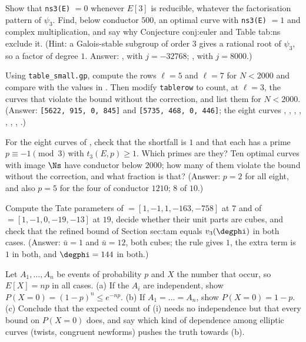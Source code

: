 \begin{sloppypar}
\begin{exercise}\label{exer:computation:ns3-reducible}
Show that \texttt{ns3(E)} $=0$ whenever $E[3]$ is reducible, whatever the factorisation pattern of $\psi_3$. Find, below conductor $500$, an optimal curve with
\texttt{ns3(E)} $=1$ and complex multiplication, and say why Conjecture conj:euler and Table tab:ns exclude it. (Hint: a Galois-stable subgroup of order $3$
gives a rational root of $\psi_3$, so a factor of degree $1$. Answer: , with $j=-32768$; , with $j=8000$.)
\end{exercise}

\begin{exercise}\label{exer:computation:tablerow}
Using \texttt{table\_small.gp}, compute the rows $\ell=5$ and $\ell=7$ for $N<2000$ and compare with the values in . Then modify
\texttt{tablerow} to count, at $\ell=3$, the curves that violate the bound without the correction, and list them for $N<2000$. (Answer: \texttt{[5622, 915,
0, 845]} and \texttt{[5735, 468, 0, 446]}; the eight curves , , , , , , ,
.)
\end{exercise}

\begin{exercise}\label{exer:computation:ns-check}
For the eight curves of , check that the shortfall is $1$ and that each has a prime $p\equiv-1\pmod3$ with $t_3(E,p)\ge1$. Which
primes are they? Ten optimal curves with image $\Ns$ have conductor below $2000$; how many of them violate the bound without the correction, and what
fraction is that? (Answer: $p=2$ for all eight, and also $p=5$ for the four of conductor $1210$; $8$ of $10$.)
\end{exercise}

\begin{exercise}\label{exer:computation:tate}
Compute the Tate parameters of  $=[1,-1,1,-163,-758]$ at $7$ and of  $=[1,-1,0,-19,-13]$ at $19$, decide whether their unit parts are
cubes, and check that the refined bound of Section sec:tam equals $v_3(\degphi)$ in both cases. (Answer: $\bar u=1$ and $\bar u=12$, both cubes; the
rule gives $1$, the extra term is $1$ in both, and $\degphi=144$ in both.)
\end{exercise}

\begin{exercise}[dependence]\label{exer:computation:dependence}
Let $A_1,\dots,A_n$ be events of probability $p$ and $X$ the number that occur, so $E[X]=np$ in all cases. (a) If the $A_i$ are independent, show
$P(X=0)=(1-p)^n\le e^{-np}$. (b) If $A_1=\dots=A_n$, show $P(X=0)=1-p$. (c) Conclude that the expected count of (i) needs
no independence but that every bound on $P(X=0)$ does, and say which kind of dependence among elliptic curves (twists, congruent newforms) pushes the
truth towards (b).
\end{exercise}


\end{sloppypar}
